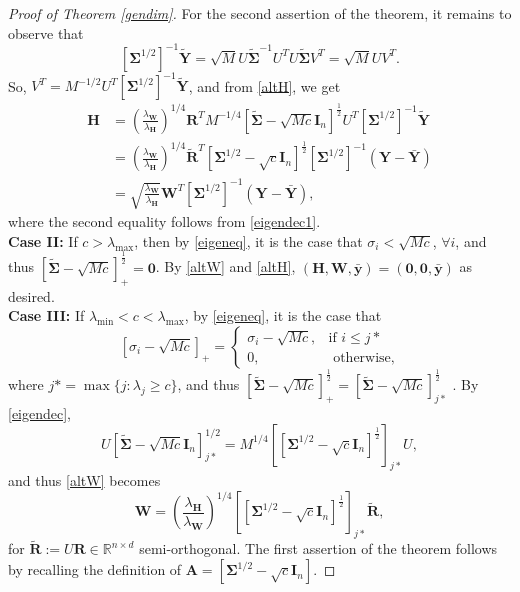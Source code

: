 \documentclass{article}
\theoremstyle{plain}
\theoremstyle{definition}
\theoremstyle{remark}
\newcommand{\bW}{{\mathbf W}}
\newcommand{\bY}{{\mathbf Y}}
\newcommand{\bR}{{\mathbf R}}
\newcommand{\bA}{{\mathbf A}}
\newcommand{\bH}{{\mathbf H}}
\newcommand{\bI}{{\mathbf I}}
\newcommand{\byb}{{\bar{\mathbf y}}}
\newcommand{\bYb}{{\bar{\mathbf Y}}}
\newcommand{\bSigma}{{\mathbf \Sigma}}
\newcommand{\lH}{\lambda_{\bH}}
\newcommand{\lW}{\lambda_{\bW}}
\begin{document}
\begin{proof}[Proof of Theorem \ref{gendim}]
For the second assertion of the theorem, it remains to observe that 
\[
[\bSigma^{1/2}]^{-1} \tilde{\bY}=\sqrt{M} U \tilde{\bSigma}^{-1} U^T U \tilde{\bSigma} V^T=\sqrt{M} U V^T.
\]
So, $V^T=M^{-1/2} U^T [\bSigma^{1/2}]^{-1} \tilde{\bY}$, and from \eqref{altH}, we get
\begin{align*}
\bH &= \left(\frac{\lW}{\lH}\right)^{1/4} \bR^T M^{-1/4} [\tilde{\bSigma}-\sqrt{M c}\bI_n]^{\frac{1}{2}} U^T [\bSigma^{1/2}]^{-1} \tilde{\bY}
\\
&= \left(\frac{\lW}{\lH}\right)^{1/4} \tilde{\bR}^T [\bSigma^{1/2}-\sqrt{c}\bI_n]^{\frac{1}{2}} [\bSigma^{1/2}]^{-1} (\bY-\bYb)
\\
&= \sqrt{\frac{\lW}{\lH}} \bW^T [\bSigma^{1/2}]^{-1} (\bY-\bYb),
\end{align*}
where the second equality follows from \eqref{eigendec1}.
\\
\textbf{Case II:} If $c>\lambda_{\text{max}}$, then by \eqref{eigeneq}, it is the case that $\sigma_i< \sqrt{M c}$, $\forall i$, and thus $[\tilde{\bSigma}-\sqrt{M c}]^{\frac{1}{2}}_{+}=\mathbf{0}$. By \eqref{altW} and \eqref{altH}, $(\bH, \bW, \byb)=(\mathbf{0}, \mathbf{0}, \byb)$ as desired.
\\
\textbf{Case III:} If $\lambda_{\text{min}}<c<\lambda_{\text{max}}$, by \eqref{eigeneq}, it is the case that
\[
[\sigma_i-\sqrt{M c}]_{+}=
\begin{cases}
    \sigma_i - \sqrt{M c}, &\text{if } i\le j*
    \\
    0, &\text{ otherwise}, 
\end{cases}
\]
where $j*=\max\{j:\lambda_j\ge c\}$, and thus
$
[\tilde{\bSigma}-\sqrt{M c}]_{+}^{\frac{1}{2}}=[\tilde{\bSigma}-\sqrt{M c}]_{j*}^{\frac{1}{2}}
$
.
By \eqref{eigendec}, 
\begin{equation} \label{eigendec2}
U \left[\tilde{\bSigma}-\sqrt{M c}\bI_n\right]^{1/2}_{j*}
=
M^{1/4} \left[\left[\bSigma^{1/2}-\sqrt{c}\bI_n\right]^{\frac{1}{2}} 
\right]_{j*}U ,
\end{equation} 
and thus \eqref{altW} becomes
\[
\bW = \left(\frac{\lH}{\lW}\right)^{1/4} \left[\left[\bSigma^{1/2}-\sqrt{c} \bI_n\right]^{\frac{1}{2}} \right]_{j*} \tilde{\bR},
\]
for $\tilde{\bR}:=U \bR\in \mathbb{R}^{n\times d}$ semi-orthogonal. The first assertion of the theorem follows by recalling the definition of $\bA=\left[\bSigma^{1/2} -\sqrt{c}\bI_n\right]$.


\end{proof}
\end{document}
